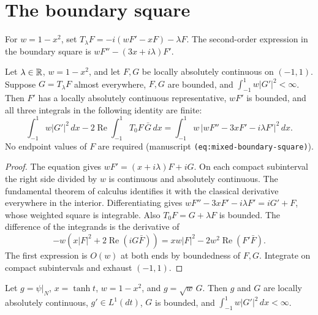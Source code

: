 \section{The boundary square}

\begin{definition}
\label{def:mixed-boundary-operators}
\leanok
For $w=1-x^2$, set $T_\lambda F=-i(wF'-xF)-\lambda F$.
The second-order expression in the boundary square is
$wF''-(3x+i\lambda)F'$.
\end{definition}

\begin{lemma}
\label{lem:mixed-boundary-square-weighted}
\leanok
Let $\lambda\in\mathbb{R}$, $w=1-x^2$, and let $F,G$ be locally absolutely
continuous on $(-1,1)$. Suppose $G=T_\lambda F$ almost everywhere,
$F,G$ are bounded, and $\int_{-1}^1w|G'|^2<\infty$.
Then $F'$ has a locally absolutely continuous representative, $wF'$ is
bounded, and all three integrals in the following identity are finite:
\[
  \int_{-1}^1w|G'|^2\,dx-2\operatorname{Re}\int_{-1}^1T_0F\,\bar G\,dx
  =\int_{-1}^1w\,|wF''-3xF'-i\lambda F'|^2\,dx.
\]
No endpoint values of $F$ are required (manuscript
\texttt{(eq:mixed-boundary-square)}).
\end{lemma}

\begin{proof}
\leanok
The equation gives $wF'=(x+i\lambda)F+iG$. On each compact subinterval
the right side divided by $w$ is continuous and absolutely continuous.
The fundamental theorem of calculus identifies it with the classical
derivative everywhere in the interior. Differentiating gives
$wF''-3xF'-i\lambda F'=iG'+F$, whose weighted square is integrable.
Also $T_0F=G+\lambda F$ is bounded. The difference of the integrands
is the derivative of
\[
 -w\left(x|F|^2+2\operatorname{Re}(iG\bar F)\right)
 = xw|F|^2-2w^2\operatorname{Re}(F'\bar F).
\]
The first expression is $O(w)$ at both ends by boundedness of $F,G$.
Integrate on compact subintervals and exhaust $(-1,1)$.
\end{proof}

\begin{lemma}
\label{lem:mixed-neumann-stream-trace}
\leanok
Let $g=\psi|_N$, $x=\tanh t$, $w=1-x^2$, and $g=\sqrt w\,G$.
Then $g$ and $G$ are locally absolutely continuous, $g'\in L^1(dt)$,
$G$ is bounded, and $\int_{-1}^1w|G'|^2\,dx<\infty$.
\end{lemma}

